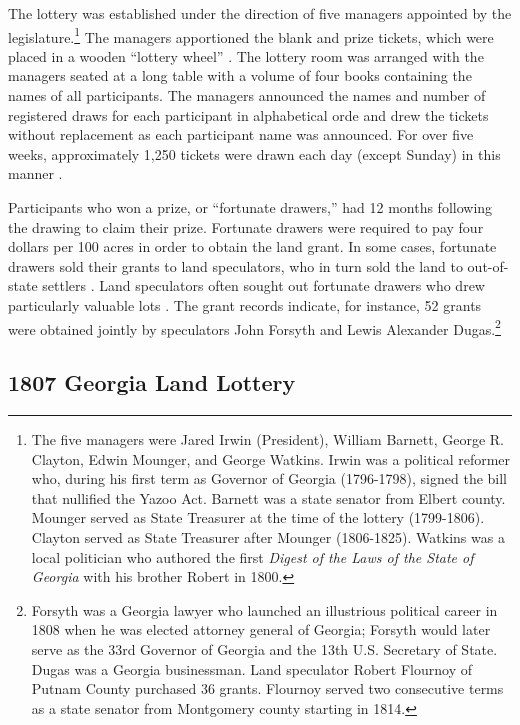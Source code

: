 The lottery was established under the direction of five managers appointed by the legislature.\footnote{The five managers were Jared Irwin (President), William Barnett, George R. Clayton, Edwin Mounger, and George Watkins. Irwin was a political reformer who, during his first term as Governor of Georgia (1796-1798), signed the bill that nullified the Yazoo Act. Barnett was a state senator from Elbert county. Mounger served as State Treasurer at the time of the lottery (1799-1806). Clayton served as State Treasurer after Mounger (1806-1825). Watkins was a local politician who authored the first \textit{Digest of the Laws of the State of Georgia} with his brother Robert in 1800.} The managers apportioned the blank and prize tickets, which were placed in a wooden ``lottery wheel'' \citep{cadle1991}. The lottery room was arranged with the managers seated at a long table with a volume of four books containing the names of all participants. The managers announced the names and number of registered draws for each participant in alphabetical orde and drew the tickets without replacement as each participant name was announced. For over five weeks, approximately 1,250 tickets were drawn each day (except Sunday) in this manner \citep{graham2004}.

Participants who won a prize, or ``fortunate drawers,'' had 12 months following the drawing to claim their prize. Fortunate drawers were required to pay four dollars per 100 acres in order to obtain the land grant. In some cases, fortunate drawers sold their grants to land speculators, who in turn sold the land to out-of-state settlers \citep{davis1981}. Land speculators often sought out fortunate drawers who drew particularly valuable lots \citep{cadle1991}. The grant records indicate, for instance, 52 grants were obtained jointly by speculators John Forsyth and Lewis Alexander Dugas.\footnote{Forsyth was a Georgia lawyer who launched an illustrious political career in 1808 when he was elected attorney general of Georgia; Forsyth would later serve as the 33rd Governor of Georgia and the 13th U.S. Secretary of State. Dugas was a Georgia businessman. Land speculator Robert Flournoy of Putnam County purchased 36 grants. Flournoy served two consecutive terms as a state senator from Montgomery county starting in 1814.}

\subsection{1807 Georgia Land Lottery}

